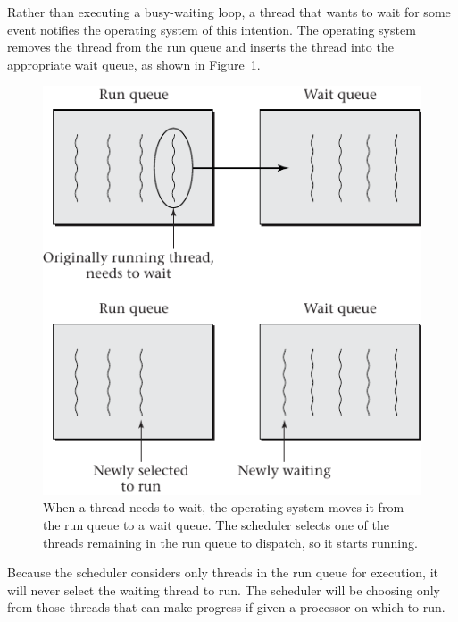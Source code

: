 Rather than executing a busy-waiting loop, a thread that wants
to wait for some event notifies the operating system of this intention.  The operating
system removes the thread from the
run queue and inserts the thread into the appropriate wait queue, as shown in
Figure~\ref{scan-3-1}.
\begin{figure}
\centerline{\includegraphics{hail_f0301}}
\caption{When a thread needs to wait, the operating system moves it
  from the run queue to a wait queue.  The scheduler selects one of
  the threads remaining in the run queue to dispatch, so it starts
  running.}
\label{scan-3-1}
\end{figure}
Because the
scheduler considers only threads in the run queue for execution, it
will never select
the waiting thread to run. The scheduler will be choosing only from
those threads that can make progress if given a processor on which to run.

